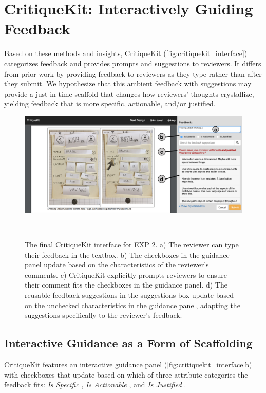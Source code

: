 \section{CritiqueKit: Interactively Guiding Feedback}
Based on these methods and insights, CritiqueKit (\autoref{fig:critiquekit_interface}) categorizes feedback and provides prompts and suggestions to reviewers. It differs from prior work by providing feedback to reviewers as they type rather than after they submit. We hypothesize that this ambient feedback with suggestions may provide a just-in-time scaffold that changes how reviewers' thoughts crystallize, yielding feedback that is more specific, actionable, and/or justified. 

\begin{figure}[b!]
\centering
  \includegraphics[width=\textwidth]{critiquekit/figures/interface.png}
  \caption[The final CritiqueKit interface for EXP 2.]{The final CritiqueKit interface for EXP 2. a) The reviewer can type their feedback in the textbox. b) The checkboxes in the guidance panel update based on the characteristics of the reviewer’s comments. c) CritiqueKit explicitly prompts reviewers to ensure their comment fits the checkboxes in the guidance panel. d) The reusable feedback suggestions in the suggestions box update based on the unchecked characteristics in the guidance panel, adapting the suggestions specifically to the reviewer's feedback.}~\label{fig:critiquekit_interface}
\end{figure}

\subsection{Interactive Guidance as a Form of Scaffolding}
CritiqueKit features an interactive guidance panel (\autoref{fig:critiquekit_interface}b) with checkboxes that update based on which of three attribute categories the feedback fits: \textit{Is Specific} \cite{Krause2017, Sadler1989, Sommers1982, Yuan2016}, \textit{Is Actionable} \cite{Dow2012, Gibbs, Kulkarni2015, Luther2015, Sadler1989, Tseng2007}, and \textit{Is Justified} \cite{Gielen2010, Krause2017, Narciss2006, Yuan2016}. 

